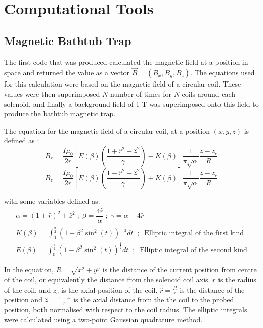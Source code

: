 \documentclass[a4paper,12pt, notitlepage]{article}
\begin{document}
\section{Computational Tools}
\subsection{Magnetic Bathtub Trap}
The first code that was produced calculated the magnetic field at a position in space and returned the value as a vector $\vec{B} = (B_{x}, B_{y}, B_{z})$. The equations used for this calculation were based on the magnetic field of a circular coil. These values were then superimposed $N$ number of times for $N$ coils around each solenoid, and finally a background field of 1 T was superimposed onto this field to produce the bathtub magnetic trap.

The equation for the magnetic field of a circular coil, at a position $(x,y,z)$ is defined as \cite{Fernow2016}:
\begin{equation}
    B_{r} = \dfrac{I\mu_{0}}{2r}\left[E(\beta)\left(\dfrac{1+\hat{r}^{2}+\hat{z}^{2}}{\gamma}\right) - K(\beta)  \right] \dfrac{1}{\pi\sqrt{\alpha}} \dfrac{z-z_{c}}{R}
\end{equation}
\begin{equation}
    B_{z} = \dfrac{I\mu_{0}}{2r}\left[E(\beta)\left(\dfrac{1-\hat{r}^{2}-\hat{z}^{2}}{\gamma}\right) + K(\beta) \right] \dfrac{1}{\pi\sqrt{\alpha}} \dfrac{z-z_{c}}{R}
\end{equation}

with some variables defined as:
\begin{gather}
    \alpha = (1+\hat{r})^{2}+\hat{z}^{2} \;;\; \beta = \dfrac{4\hat{r}}{\alpha} \;;\; \gamma = \alpha - 4\hat{r}\\
    K(\beta) = \int_{0}^{\frac{\pi}{2}} (1 - \beta^{2}\sin^{2}(t))^{-\frac{1}{2}}dt \;\;;\;\; \textrm{Elliptic integral of the first kind}\\
    E(\beta) = \int_{0}^{\frac{\pi}{2}} (1 - \beta^{2}\sin^{2}(t))^{\frac{1}{2}}dt \;\;;\;\; \textrm{Elliptic integral of the second kind}
\end{gather}

In the equation, $R=\sqrt{x^{2}+y^{y}}$ is the distance of the current position from centre of the coil, or equivalently the distance from the solenoid coil axis. $r$ is the radius of the coil, and $z_{c}$ is the axial position of the coil. $\hat{r}=\frac{R}{r}$ is the distance of the position and $\hat{z}=\frac{z-z_{c}}{r}$ is the axial distance from the the coil to the probed position, both normalised with respect to the coil radius. 
The elliptic integrals were calculated using a two-point Gaussian quadrature method.
\end{document}
